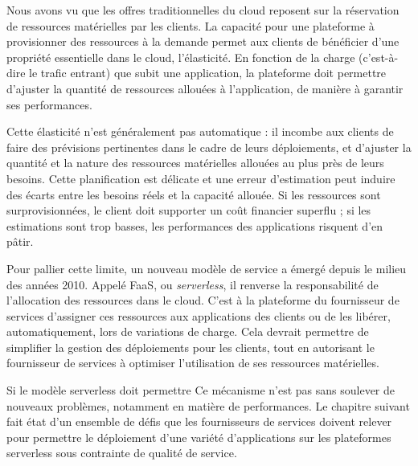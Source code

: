 Nous avons vu que les offres traditionnelles du cloud reposent sur la réservation de ressources matérielles par les clients. La capacité pour une plateforme à provisionner des ressources à la demande permet aux clients de bénéficier d'une propriété essentielle dans le cloud, l'élasticité. En fonction de la charge (c'est-à-dire le trafic entrant) que subit une application, la plateforme doit permettre d'ajuster la quantité de ressources allouées à l'application, de manière à garantir ses performances.

Cette élasticité n'est généralement pas automatique : il incombe aux clients de faire des prévisions pertinentes dans le cadre de leurs déploiements, et d'ajuster la quantité et la nature des ressources matérielles allouées au plus près de leurs besoins. Cette planification est délicate et une erreur d'estimation peut induire des écarts entre les besoins réels et la capacité allouée. Si les ressources sont surprovisionnées, le client doit supporter un coût financier superflu ; si les estimations sont trop basses, les performances des applications risquent d'en pâtir.

Pour pallier cette limite, un nouveau modèle de service a émergé depuis le milieu des années 2010. Appelé \gls{FaaS}, ou \textit{serverless}, il renverse la responsabilité de l'allocation des ressources dans le cloud. C'est à la plateforme du fournisseur de services d'assigner ces ressources aux applications des clients ou de les libérer, automatiquement, lors de variations de charge. Cela devrait permettre de simplifier la gestion des déploiements pour les clients, tout en autorisant le fournisseur de services à optimiser l'utilisation de ses ressources matérielles.

Si le modèle serverless doit permettre Ce mécanisme n'est pas sans soulever de nouveaux problèmes, notamment en matière de performances. Le chapitre suivant fait état d'un ensemble de défis que les fournisseurs de services doivent relever pour permettre le déploiement d'une variété d'applications sur les plateformes serverless sous contrainte de qualité de service.
